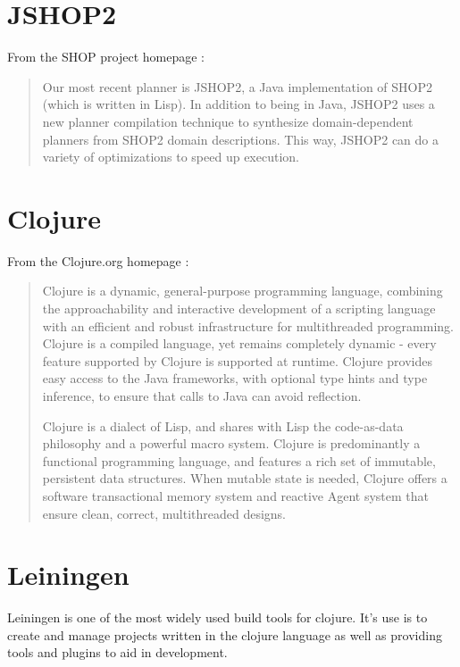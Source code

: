 \section{JSHOP2}
\label{appendix:JSHOP2}
From the SHOP project homepage \citep{UniversityofMaryland2006}:

\begin{quote}
  Our most recent planner is JSHOP2, a Java implementation of SHOP2 (which is
  written in Lisp). In addition to being in Java, JSHOP2 uses a new planner
  compilation technique to synthesize domain-dependent planners from SHOP2
  domain descriptions. This way, JSHOP2 can do a variety of optimizations to
  speed up execution.
\end{quote}

\section{Clojure}
\label{appendix:clojure}
From the Clojure.org homepage \citep{Hickey2018a}:

\begin{quote}
  Clojure is a dynamic, general-purpose programming language, combining the
  approachability and interactive development of a scripting language with an
  efficient and robust infrastructure for multithreaded programming. Clojure is
  a compiled language, yet remains completely dynamic - every feature supported
  by Clojure is supported at runtime. Clojure provides easy access to the Java
  frameworks, with optional type hints and type inference, to ensure that calls
  to Java can avoid reflection.

  Clojure is a dialect of Lisp, and shares with Lisp the code-as-data philosophy
  and a powerful macro system. Clojure is predominantly a functional programming
  language, and features a rich set of immutable, persistent data structures.
  When mutable state is needed, Clojure offers a software transactional memory
  system and reactive Agent system that ensure clean, correct, multithreaded
  designs.
\end{quote}

\section{Leiningen}
\label{appendix:leiningen}
Leiningen is one of the most widely used build tools for clojure. It's use is to
create and manage projects written in the clojure language as well as providing
tools and plugins to aid in development.

